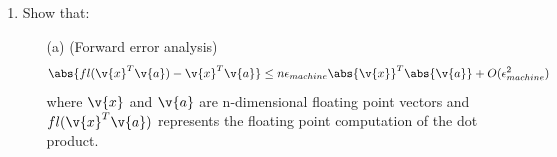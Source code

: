 \documentclass[11pt]{article}
\begin{document}
\begin{enumerate}
\begin{proof}
            Let $\v{y} \in K$, then let $F(t) = \phi(\hat{\v{x}} + t \v{y})$.
            Note that $F(0) = \phi(\hat{\v{x}})$.
            Since $\hat{\v{x}}$ minimizes $\phi$ over $K$, $F(0) \le F(t)$ for
            any $t$.
            Thus $0$ is a minimizer of $F$ and $F'(0) = 0$.
            Using vector calculus
            \[
                F'(t) = \v{y}^T \nabla \phi(\hat{\v{x}} + t\v{y})
            \]
            Now using $t = 0$ we see that
            \begin{align*}
                F'(0) &= 0 \\
                \v{y}^T \nabla \phi(\hat{\v{x}}) &= 0
            \end{align*}
            Thus $\nabla \phi(\hat{\v{x}}) \perp K$, because $\v{y}^T \nabla \phi(\hat{\v{x}}) = 0$
            for any vector $\v{y} \in K$.
        \end{proof}

    \item %
        Show that:
        \begin{enumerate}
            \item[(a)] %
                (Forward error analysis)
                \[
                    \abs{fl(\v{x}^T \v{a}) - \v{x}^T \v{a}} \le n \epsilon_{machine} \abs{\v{x}}^T \abs{\v{a}} + O(\epsilon_{machine}^2)
                \]
                where $\v{x}$ and $\v{a}$ are n-dimensional floating point vectors and
                $fl(\v{x}^T \v{a})$ represents the floating point computation of the dot
                product.


\end{enumerate}
\end{enumerate}
\end{document}
